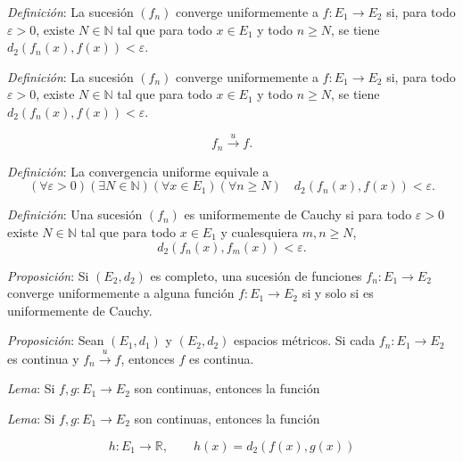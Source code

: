 \documentclass{beamer}
\begin{document}
  \begin{frame}
    \textit{Definición}: La sucesión $(f_n)$ converge uniformemente a $f:E_1\to E_2$ si, para todo $\varepsilon>0$, existe $N\in\mathbb{N}$ tal que para todo $x\in E_1$ y todo $n\geq N$, se tiene $d_2(f_n(x),f(x))<\varepsilon$.
  \end{frame}

  \begin{frame}
    \textit{Definición}: La sucesión $(f_n)$ converge uniformemente a $f:E_1\to E_2$ si, para todo $\varepsilon>0$, existe $N\in\mathbb{N}$ tal que para todo $x\in E_1$ y todo $n\geq N$, se tiene $d_2(f_n(x),f(x))<\varepsilon$.

    \[f_n\xrightarrow{u} f.\]
  \end{frame}

  \begin{frame}
    \textit{Definición}: La convergencia uniforme equivale a
    \[(\forall\varepsilon>0)(\exists N\in\mathbb{N})
    (\forall x\in E_1)(\forall n\geq N)\quad
    d_2(f_n(x),f(x))<\varepsilon.\]
  \end{frame}

  \begin{frame}
    \textit{Definición}: Una sucesión $(f_n)$ es uniformemente de Cauchy si para todo $\varepsilon>0$ existe $N\in\mathbb{N}$ tal que para todo $x\in E_1$ y cualesquiera $m,n\geq N$,
    \[d_2(f_n(x),f_m(x))<\varepsilon.\]
  \end{frame}

  \begin{frame}
    \textit{Proposición}: Si $(E_2,d_2)$ es completo, una sucesión de funciones $f_n:E_1\to E_2$ converge uniformemente a alguna función $f:E_1\to E_2$ si y solo si es uniformemente de Cauchy.
  \end{frame}

  \begin{frame}
    \textit{Proposición}: Sean $(E_1,d_1)$ y $(E_2,d_2)$ espacios métricos. Si cada $f_n:E_1\to E_2$ es continua y $f_n\xrightarrow{u}f$, entonces $f$ es continua.
  \end{frame}

  \begin{frame}
    \textit{Lema}: Si $f,g:E_1\to E_2$ son continuas, entonces la función
  \end{frame}

  \begin{frame}
    \textit{Lema}: Si $f,g:E_1\to E_2$ son continuas, entonces la función

    \[h:E_1\to\mathbb{R},\qquad h(x)=d_2(f(x),g(x))\]
  \end{frame}
\end{document}
